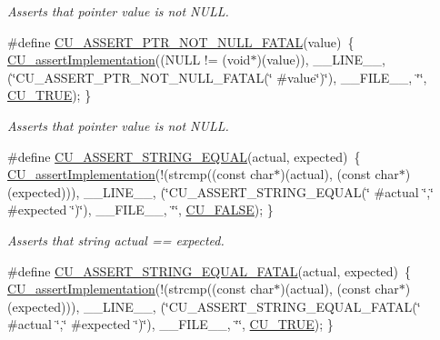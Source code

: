 \begin{DoxyCompactItemize}
\begin{DoxyCompactList}\small\item\em Asserts that pointer value is not N\+U\+L\+L. \end{DoxyCompactList}\item 
\#define \hyperlink{group___framework_ga9edb99bd9b5b546fee56626db3ebfc6e}{C\+U\+\_\+\+A\+S\+S\+E\+R\+T\+\_\+\+P\+T\+R\+\_\+\+N\+O\+T\+\_\+\+N\+U\+L\+L\+\_\+\+F\+A\+T\+A\+L}(value)~\{ \hyperlink{group___framework_gad409fc536d9d3fb5f659c76421e8ce3b}{C\+U\+\_\+assert\+Implementation}((N\+U\+L\+L != (void$\ast$)(value)), \+\_\+\+\_\+\+L\+I\+N\+E\+\_\+\+\_\+, (\char`\"{}C\+U\+\_\+\+A\+S\+S\+E\+R\+T\+\_\+\+P\+T\+R\+\_\+\+N\+O\+T\+\_\+\+N\+U\+L\+L\+\_\+\+F\+A\+T\+A\+L(\char`\"{} \#value\char`\"{})\char`\"{}), \+\_\+\+\_\+\+F\+I\+L\+E\+\_\+\+\_\+, \char`\"{}\char`\"{}, \hyperlink{group___framework_ga99641394bc766ca9c4a295e942fed1ef}{C\+U\+\_\+\+T\+R\+U\+E}); \}
\begin{DoxyCompactList}\small\item\em Asserts that pointer value is not N\+U\+L\+L. \end{DoxyCompactList}\item 
\#define \hyperlink{group___framework_gaf70ea1c422a5bda04a31db754dbabb56}{C\+U\+\_\+\+A\+S\+S\+E\+R\+T\+\_\+\+S\+T\+R\+I\+N\+G\+\_\+\+E\+Q\+U\+A\+L}(actual, expected)~\{ \hyperlink{group___framework_gad409fc536d9d3fb5f659c76421e8ce3b}{C\+U\+\_\+assert\+Implementation}(!(strcmp((const char$\ast$)(actual), (const char$\ast$)(expected))), \+\_\+\+\_\+\+L\+I\+N\+E\+\_\+\+\_\+, (\char`\"{}C\+U\+\_\+\+A\+S\+S\+E\+R\+T\+\_\+\+S\+T\+R\+I\+N\+G\+\_\+\+E\+Q\+U\+A\+L(\char`\"{} \#actual \char`\"{},\char`\"{}  \#expected \char`\"{})\char`\"{}), \+\_\+\+\_\+\+F\+I\+L\+E\+\_\+\+\_\+, \char`\"{}\char`\"{}, \hyperlink{group___framework_ga7453214541b156ef868681eaafe60860}{C\+U\+\_\+\+F\+A\+L\+S\+E}); \}
\begin{DoxyCompactList}\small\item\em Asserts that string actual == expected. \end{DoxyCompactList}\item 
\#define \hyperlink{group___framework_ga1d7267b09f629605d8c7fe9ab57ef960}{C\+U\+\_\+\+A\+S\+S\+E\+R\+T\+\_\+\+S\+T\+R\+I\+N\+G\+\_\+\+E\+Q\+U\+A\+L\+\_\+\+F\+A\+T\+A\+L}(actual, expected)~\{ \hyperlink{group___framework_gad409fc536d9d3fb5f659c76421e8ce3b}{C\+U\+\_\+assert\+Implementation}(!(strcmp((const char$\ast$)(actual), (const char$\ast$)(expected))), \+\_\+\+\_\+\+L\+I\+N\+E\+\_\+\+\_\+, (\char`\"{}C\+U\+\_\+\+A\+S\+S\+E\+R\+T\+\_\+\+S\+T\+R\+I\+N\+G\+\_\+\+E\+Q\+U\+A\+L\+\_\+\+F\+A\+T\+A\+L(\char`\"{} \#actual \char`\"{},\char`\"{}  \#expected \char`\"{})\char`\"{}), \+\_\+\+\_\+\+F\+I\+L\+E\+\_\+\+\_\+, \char`\"{}\char`\"{}, \hyperlink{group___framework_ga99641394bc766ca9c4a295e942fed1ef}{C\+U\+\_\+\+T\+R\+U\+E}); \}

\end{DoxyCompactItemize}
